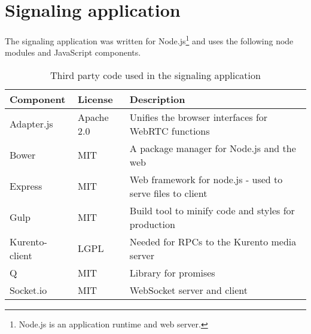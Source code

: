 \documentclass[../../../thesis.tex]{subfiles}
\begin{document}
\section{Signaling application}

The signaling application was written for Node.js\footnote{Node.js\cite{node-js} is an application runtime and web server.} and uses the following node modules and JavaScript components.

\begin{table}[htbp]
\centering
\caption{Third party code used in the signaling application}
\begin{tabular}{l l l}
    \toprule
    \textbf{Component} & \textbf{License} & \textbf{Description}\\
    \midrule
    
    Adapter.js\footnotemark[3] & Apache 2.0 & Unifies the browser interfaces for WebRTC functions\\ 
    Bower\footnotemark[4] &	MIT & A package manager for Node.js and the web\\
    Express\footnotemark[5]	& MIT & Web framework for node.js - used to serve files to client \\
    Gulp\footnotemark[6] & MIT & Build tool to minify code and styles for production\\
    Kurento-client\footnotemark[7] & LGPL & Needed for RPCs to the Kurento media server \\
	Q\footnotemark[8] &	MIT & Library for promises\\
    Socket.io\footnotemark[9] & MIT & WebSocket server and client\\

		\bottomrule
\end{tabular}%
\label{tab:node-modules}%
\end{table}%

\end{document}
